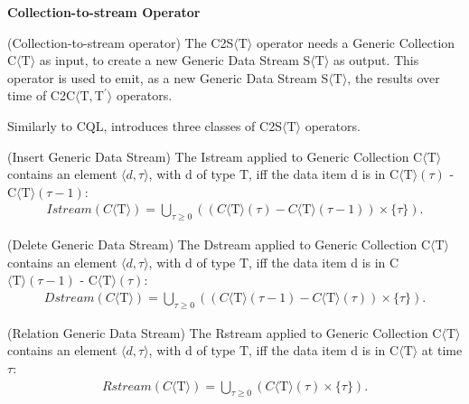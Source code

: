 \medskip
\noindent
\textbf{Collection-to-stream Operator}
\medskip

\begin{Definition}
(Collection-to-stream operator) The C2S$\langle\mathrm{T}\rangle$ operator needs a Generic Collection C$\langle\mathrm{T}\rangle$ as input, to create a new Generic Data Stream S$\langle\mathrm{T}\rangle$ as output. 
This operator is used to emit, as a new Generic Data Stream S$\langle\mathrm{T}\rangle$, the results over time of C2C$\langle\mathrm{T},\mathrm{T^{\prime}}\rangle$ operators. 
\end{Definition}

Similarly to CQL, \river{} introduces three classes of C2S$\langle\mathrm{T}\rangle$ operators.

\begin{Definition}
(Insert Generic Data Stream) The Istream applied to Generic Collection C$\langle\mathrm{T}\rangle$ contains an element $\langle d,\tau \rangle$, with d of type $\mathrm{T}$, iff the data item d is in C$\langle\mathrm{T}\rangle(\tau)$ - C$\langle\mathrm{T}\rangle(\tau - 1)$: 
\noindent\begin{align*}
Istream(C\langle\mathrm{T}\rangle) = \bigcup_{\tau \geq 0} ((C\langle\mathrm{T}\rangle(\tau) - C\langle\mathrm{T}\rangle(\tau - 1)) \times \{\tau\}).
\end{align*} 
\end{Definition}

\begin{Definition}
(Delete Generic Data Stream) The Dstream applied to Generic Collection C$\langle\mathrm{T}\rangle$ contains an element $\langle d,\tau \rangle$, with d of type $\mathrm{T}$, iff the data item d is in C$\langle\mathrm{T}\rangle(\tau - 1)$ - C$\langle\mathrm{T}\rangle(\tau)$: 
\noindent\begin{align*}
Dstream(C\langle\mathrm{T}\rangle) = \bigcup_{\tau \geq 0} ((C\langle\mathrm{T}\rangle(\tau - 1) - C\langle\mathrm{T}\rangle(\tau)) \times \{\tau\}).
\end{align*} 
\end{Definition}

\begin{Definition}
(Relation Generic Data Stream) The Rstream applied to Generic Collection C$\langle\mathrm{T}\rangle$ contains an element $\langle d,\tau \rangle$, with d of type $\mathrm{T}$, iff the data item d is in C$\langle\mathrm{T}\rangle$ at time $\tau$: 
\noindent\begin{align*}
Rstream(C\langle\mathrm{T}\rangle) = \bigcup_{\tau \geq 0} (C\langle\mathrm{T}\rangle(\tau) \times \{\tau\}).
\end{align*} 
\end{Definition}

